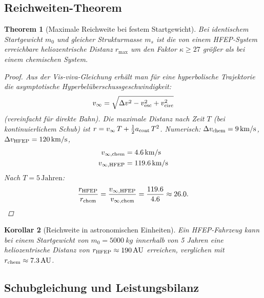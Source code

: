 ﻿\documentclass[a4paper,12pt,twoside]{article}
\theoremstyle{plain}
\newtheorem{theorem}{Theorem}[section]
\newtheorem{corollary}[theorem]{Korollar}
\theoremstyle{definition}
\theoremstyle{remark}
\newcommand{\Dv}{\Delta v}
\newcommand{\mzero}{m_0}
\begin{document}
	\subsection{Reichweiten-Theorem}
	
	\begin{theorem}[Maximale Reichweite bei festem Startgewicht]
		\label{thm:range}
		Bei identischem Startgewicht $\mzero$ und gleicher Strukturmasse $m_s$
		ist die von einem HFEP-System erreichbare heliozentrische Distanz $r_{\max}$ um den
		Faktor $\kappa \geq 27$ größer als bei einem chemischen System.
		\begin{proof}
			Aus der Vis-viva-Gleichung erhält man für eine hyperbolische Trajektorie die
			asymptotische Hyperbel\-überschuss\-geschwindigkeit:
			\begin{equation}
				v_\infty = \sqrt{\Dv^2 - v_{\rm esc}^2 + v_{\rm circ}^2}
			\end{equation}
			(vereinfacht für direkte Bahn). Die maximale Distanz nach Zeit $T$ (bei kontinuierlichem
			Schub) ist $r = v_\infty\,T + \frac{1}{2}a_{\rm cont}\,T^2$.
			Numerisch: $\Dv_{\rm chem} = \SI{9}{km/s}$, $\Dv_{\rm HFEP} = \SI{120}{km/s}$,
			\begin{align}
				v_{\infty,\rm chem} &= \SI{4.6}{km/s} \\
				v_{\infty,\rm HFEP} &= \SI{119.6}{km/s}
			\end{align}
			Nach $T = 5\,\text{Jahren}$:
			\[
			\frac{r_{\rm HFEP}}{r_{\rm chem}}
			= \frac{v_{\infty,\rm HFEP}}{v_{\infty,\rm chem}}
			= \frac{119.6}{4.6} \approx 26.0.
			\qedhere
			\]
		\end{proof}
	\end{theorem}
	
	\begin{corollary}[Reichweite in astronomischen Einheiten]
		Ein HFEP-Fahrzeug kann bei einem Startgewicht von $m_0 = \SI{5000}{kg}$ innerhalb
		von 5 Jahren eine heliozentrische Distanz von $r_{\rm HFEP} \approx \SI{190}{AU}$
		erreichen, verglichen mit $r_{\rm chem} \approx \SI{7.3}{AU}$.
	\end{corollary}
	
	\subsection{Schubgleichung und Leistungsbilanz}
	
\end{document}

